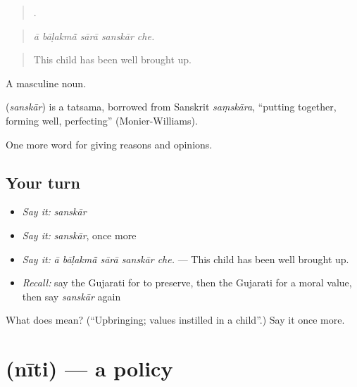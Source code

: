 \begin{quote}
    .
\end{quote}

\begin{quote}
\emph{ā bāḷakmā̃ sārā sanskār che.}
\end{quote}

\begin{quote}
This child has been well brought up.
\end{quote}

A masculine noun.

\begin{cousinweb}
\textbf{} (\emph{sanskār}) is a tatsama, borrowed from Sanskrit \emph{saṃskāra}, \textquotedblleft{}putting together, forming well, perfecting\textquotedblright{} (Monier-Williams).
\end{cousinweb}

\begin{grammarlens}[title={What you've built}]
One more word for giving reasons and opinions.
\end{grammarlens}

\subsection*{Your turn}
\begin{itemize}
\raggedright
  \item \emph{Say it:} \emph{sanskār}
  \item \emph{Say it:} \emph{sanskār}, once more
  \item \emph{Say it:} \emph{ā bāḷakmā̃ sārā sanskār che.} — This child has been well brought up.
  \item \emph{Recall:} say the Gujarati for to preserve, then the Gujarati for a moral value, then say \emph{sanskār} again
\end{itemize}

\begin{tcolorbox}[breakable,colback=teal!4,colframe=teal!35!black,title={Before you move on}]
What does  mean? (\textquotedblleft{}Upbringing; values instilled in a child\textquotedblright{}.) Say it once more.
\end{tcolorbox}
\section[\texorpdfstring{\gu{નીતિ} (nīti)}{નીતિ (nīti)}]{ (nīti) — a policy}

